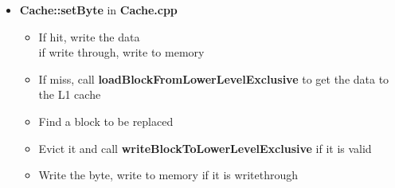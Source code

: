 \documentclass{article}
\begin{document}
\begin{itemize}
    \item \textbf{Cache::setByte} in \textbf{Cache.cpp}
        \begin{itemize}
            \item If hit, write the data\\
                    if write through, write to memory
            \item If miss, call \textbf{loadBlockFromLowerLevelExclusive} to get the data to the L1 cache
            \item Find a block to be replaced
            \item Evict it and call \textbf{writeBlockToLowerLevelExclusive} if it is valid
            \item Write the byte, write to memory if it is writethrough
        \end{itemize}
\end{itemize}
\end{document}
